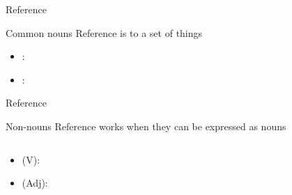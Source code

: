 \documentclass{beamer}
\newcommand{\subtwotwo}{Reference}
\begin{document}
      \begin{frame}[t]{\subtwotwo}
        \begin{block}{Common nouns}
          Reference is to a set of things
        \end{block}
        \begin{block}{}
          \begin{itemize}
            \item {}:
            \item<2-> :
          \end{itemize}
        \end{block}
        \begin{center}
        \end{center}
      \end{frame}

      \begin{frame}[t]{\subtwotwo}
        \begin{block}{Non-nouns}
          Reference works when they can be expressed as nouns
        \end{block}
        \begin{columns}
            \begin{minipage}[c][0.6\textheight]{\linewidth}
              \begin{block}{}
                \begin{itemize}
                  \item {} (V):
                  \item<2->  (Adj):
                \end{itemize}
              \end{block}
            \end{minipage}
        \end{columns}
      \end{frame}
\end{document}
